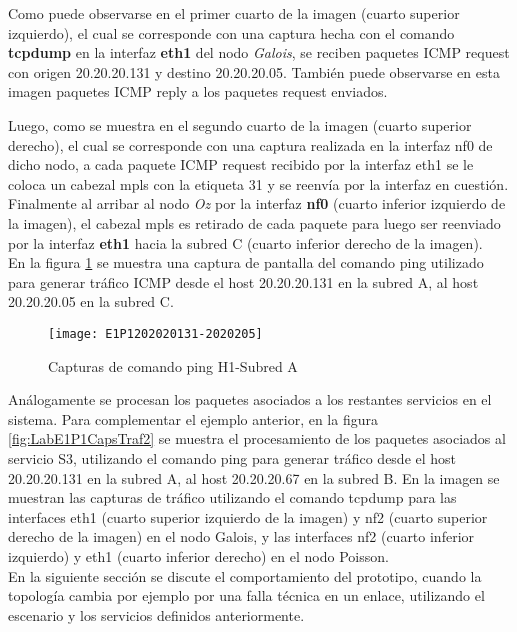 Como puede observarse en el primer cuarto de la imagen (cuarto superior izquierdo), el cual se corresponde con una captura hecha con el comando \textbf{tcpdump} en la interfaz \textbf{eth1} del nodo \textit{Galois}, se reciben paquetes ICMP request con origen 20.20.20.131 y destino 20.20.20.05. Tambi\'en puede observarse en esta imagen paquetes ICMP reply a los paquetes request enviados.

Luego, como se muestra en el segundo cuarto de la imagen (cuarto superior derecho), el cual se corresponde con una captura realizada en la interfaz nf0 de dicho nodo, a cada paquete ICMP request recibido por la interfaz eth1 se le coloca un cabezal mpls con la etiqueta 31 y se reenvía por la interfaz en cuestión. Finalmente al arribar al nodo \textit{Oz} por la interfaz \textbf{nf0} (cuarto inferior izquierdo de la imagen), el cabezal mpls es retirado de cada paquete para luego ser reenviado por la interfaz \textbf{eth1} hacia la subred C (cuarto inferior derecho de la imagen).\\

En la figura \ref{fig:LabE1P1CapHost} se muestra una captura de pantalla del comando ping utilizado para generar tr\'afico ICMP desde el host 20.20.20.131 en la subred A, al host 20.20.20.05 en la subred C.

\begin{figure}[h!] 
\centering    
\texttt{[image: E1P1202020131-2020205]}
\caption[Capturas de comando ping H1-Subred A]{Capturas de comando ping H1-Subred A}
\label{fig:LabE1P1CapHost}
\end{figure}

Análogamente se procesan los paquetes asociados a los restantes servicios en el sistema. Para complementar el ejemplo anterior, en la figura \ref{fig:LabE1P1CapsTraf2} se muestra el procesamiento de los paquetes asociados al servicio S3, utilizando el comando ping para generar tr\'afico desde el host 20.20.20.131 en la subred A, al host 20.20.20.67 en la subred B. En la imagen se muestran las capturas de tr\'afico utilizando el comando tcpdump para las interfaces eth1 (cuarto superior izquierdo de la imagen) y nf2 (cuarto superior derecho de la imagen) en el nodo Galois, y las interfaces nf2  
 (cuarto inferior izquierdo) y eth1 (cuarto inferior derecho) en el nodo Poisson.\\

En la siguiente secci\'on se discute el comportamiento del prototipo, cuando la topolog\'ia cambia por ejemplo por una falla t\'ecnica en un enlace, utilizando el escenario y los servicios definidos anteriormente.

